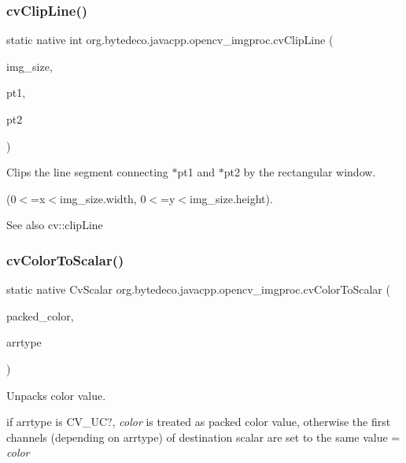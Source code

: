 \subsubsection{\texorpdfstring{cv\+Clip\+Line()}{cvClipLine()}}
{\footnotesize\ttfamily static native int org.\+bytedeco.\+javacpp.\+opencv\+\_\+imgproc.\+cv\+Clip\+Line (\begin{DoxyParamCaption}\item[{@By\+Val Cv\+Size}]{img\+\_\+size,  }\item[{Cv\+fr.antproject.utils.Point}]{pt1,  }\item[{Cv\+fr.antproject.utils.Point}]{pt2 }\end{DoxyParamCaption})\hspace{0.3cm}{\ttfamily [static]}}



Clips the line segment connecting $\ast$pt1 and $\ast$pt2 by the rectangular window. 

(0$<$=x$<$img\+\_\+size.\+width, 0$<$=y$<$img\+\_\+size.\+height). \begin{DoxySeeAlso}{See also}
cv\+::clip\+Line 
\end{DoxySeeAlso}
\mbox{\label{group__imgproc__c_ga740bdb87be7fa22bb0fda2e620a13777}} 
\subsubsection{\texorpdfstring{cv\+Color\+To\+Scalar()}{cvColorToScalar()}}
{\footnotesize\ttfamily static native Cv\+Scalar org.\+bytedeco.\+javacpp.\+opencv\+\_\+imgproc.\+cv\+Color\+To\+Scalar (\begin{DoxyParamCaption}\item[{double}]{packed\+\_\+color,  }\item[{int}]{arrtype }\end{DoxyParamCaption})\hspace{0.3cm}{\ttfamily [static]}}



Unpacks color value. 

if arrtype is C\+V\+\_\+UC?, {\itshape color} is treated as packed color value, otherwise the first channels (depending on arrtype) of destination scalar are set to the same value = {\itshape color} \mbox{\label{group__imgproc__c_gae639bb492f6f6f8434a3bf4a6ae085c9}} 
